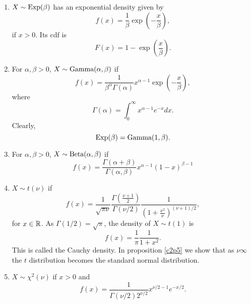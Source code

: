\documentclass{article}
\begin{document}
\begin{enumerate}
\item $X \sim \text{Exp}(\beta)$ has an exponential density given by
\begin{equation}\label{c2e13}
f(x) = \frac{1}{\beta}\exp\left(-\frac{x}{\beta}\right), 
\end{equation}
if $x > 0$. Its cdf is 
\begin{equation}\label{c2e14}
F(x) = 1 - \exp\left(\frac{x}{\beta}\right).
\end{equation}

\item For $\alpha, \beta > 0$, $X \sim \text{Gamma}(\alpha, \beta)$ if
\begin{equation}\label{c2e15}
f(x) = \frac{1}{\beta^\alpha\Gamma(\alpha)}x^{\alpha - 1}
\exp\left(-\frac{x}{\beta}\right),
\end{equation}
where
\begin{equation}\label{c2e16}
\Gamma(\alpha) = \int_0^\infty x^{\alpha - 1}e^{-x}dx.
\end{equation}
Clearly,
\begin{equation}\label{c2e17}
\text{Exp}(\beta) = \text{Gamma}(1, \beta).
\end{equation}

\item For $\alpha, \beta > 0$, $X \sim \text{Beta}(\alpha, \beta)$ if
\begin{equation}\label{c2e18}
f(x) = \frac{\Gamma(\alpha + \beta)}{\Gamma(\alpha, \beta)}
       x^{\alpha - 1}(1 - x)^{\beta - 1}
\end{equation}

\item $X \sim t(\nu)$ if
\begin{equation}\label{c2e19}
f(x) = \frac{1}{\sqrt{\pi\nu}}\frac{\Gamma(\frac{\nu+1}{2})}{\Gamma(\nu/2)}
	   \frac{1}{\left(1 + \frac{x^2}{\nu}\right)^{(\nu+1)/2}},
\end{equation}
for $x \in \mathbb{R}$. As $\Gamma(1/2) = \sqrt{\pi}$, the density of $X \sim t(1)$ is
\begin{equation}\label{c2e20}
f(x) = \frac{1}{\pi}\frac{1}{1 + x^2}.
\end{equation}
This is called the Cauchy density. In proposition \ref{c2p5} we show that as 
$\nu \infty$ the $t$ distribution becomes the standard normal distribution.

\item $X \sim \chi^2(\nu)$ if $x > 0$ and
\begin{equation}\label{c2e21}
f(x) = \frac{1}{\Gamma(\nu/2) 2^{\nu/2}}x^{\nu/2 - 1}e^{-x/2}.
\end{equation}
\end{enumerate}
\end{document}
